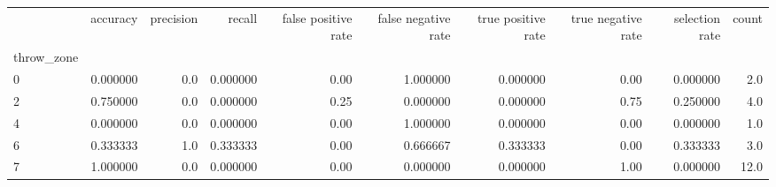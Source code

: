 \begin{tabular}{lrrrrrrrrr}
\toprule
{} &  accuracy &  precision &    recall &  false positive rate &  false negative rate &  true positive rate &  true negative rate &  selection rate &  count \\
throw\_zone &           &            &           &                      &                      &                     &                     &                 &        \\
\midrule
0          &  0.000000 &        0.0 &  0.000000 &                 0.00 &             1.000000 &            0.000000 &                0.00 &        0.000000 &    2.0 \\
2          &  0.750000 &        0.0 &  0.000000 &                 0.25 &             0.000000 &            0.000000 &                0.75 &        0.250000 &    4.0 \\
4          &  0.000000 &        0.0 &  0.000000 &                 0.00 &             1.000000 &            0.000000 &                0.00 &        0.000000 &    1.0 \\
6          &  0.333333 &        1.0 &  0.333333 &                 0.00 &             0.666667 &            0.333333 &                0.00 &        0.333333 &    3.0 \\
7          &  1.000000 &        0.0 &  0.000000 &                 0.00 &             0.000000 &            0.000000 &                1.00 &        0.000000 &   12.0 \\
\bottomrule
\end{tabular}
